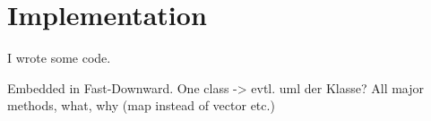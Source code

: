 \chapter{Implementation}
I wrote some code.

Embedded in Fast-Downward.
One class -> evtl. uml der Klasse?
All major methods, what, why (map instead of vector etc.)